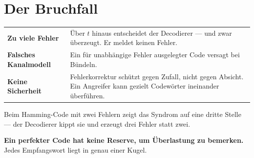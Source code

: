 \section{Der Bruchfall}

\begin{warnung}
\begin{center}
{\small
\renewcommand{\arraystretch}{1.52}
\begin{tabular}{@{}P{2.4cm}P{6.2cm}@{}}
\toprule
\textbf{Zu viele Fehler} & Über $t$ hinaus entscheidet der Decodierer  --- und zwar überzeugt. Er meldet keinen Fehler.\\
\textbf{Falsches Kanalmodell} & Ein für unabhängige Fehler ausgelegter Code versagt bei Bündeln.\\
\textbf{Keine Sicherheit} & Fehlerkorrektur schützt gegen Zufall, nicht gegen Absicht. Ein Angreifer kann gezielt Codewörter ineinander überführen.\\
\bottomrule
\end{tabular}}
\end{center}

Beim Hamming-Code mit zwei Fehlern zeigt das Syndrom auf eine dritte Stelle --- der Decodierer kippt sie und erzeugt drei Fehler statt zwei.

\begin{center}
\begin{minipage}{0.9\textwidth}
\textbf{Ein perfekter Code hat keine Reserve, um Überlastung zu bemerken.} Jedes Empfangswort liegt in genau einer Kugel.
\end{minipage}
\end{center}

\begin{center}
\begin{minipage}{0.88\textwidth}
\end{minipage}
\end{center}

\begin{center}
\begin{minipage}{0.88\textwidth}
\end{minipage}
\end{center}
\end{warnung}


